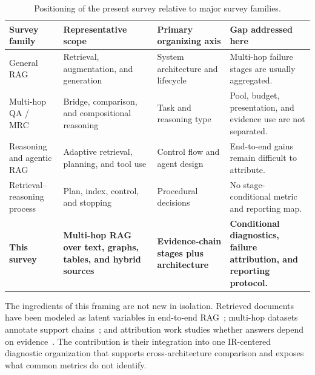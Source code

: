 \documentclass[manuscript,review]{acmart}
\theoremstyle{definition}
\theoremstyle{plain}
\theoremstyle{remark}
\begin{document}
\begin{table}[t]
\caption{Positioning of the present survey relative to major survey families.}
\label{tab:survey_crosswalk}
\centering
\scriptsize
\begin{tabularx}{\linewidth}{@{}p{2.5cm}p{2.7cm}p{2.8cm}Y@{}}
\toprule
Survey family & Representative scope & Primary organizing axis & Gap addressed here \\
\midrule
General RAG~\cite{gao2023ragsurvey,fan2024ragllmsurvey} & Retrieval, augmentation, and generation & System architecture and lifecycle & Multi-hop failure stages are usually aggregated. \\
Multi-hop QA / MRC~\cite{mavi2022mhqasurvey,mohammadi2024mhmrcsurvey} & Bridge, comparison, and compositional reasoning & Task and reasoning type & Pool, budget, presentation, and evidence use are not separated. \\
Reasoning and agentic RAG~\cite{singh2025agenticragsurvey,liang2025reasoningragsurvey} & Adaptive retrieval, planning, and tool use & Control flow and agent design & End-to-end gains remain difficult to attribute. \\
Retrieval--reasoning process~\cite{ji2026retrievalreasoning} & Plan, index, control, and stopping & Procedural decisions & No stage-conditional metric and reporting map. \\
\textbf{This survey} & \textbf{Multi-hop RAG over text, graphs, tables, and hybrid sources} & \textbf{Evidence-chain stages plus architecture} & \textbf{Conditional diagnostics, failure attribution, and reporting protocol.} \\
\bottomrule
\end{tabularx}
\end{table}

The ingredients of this framing are not new in isolation. Retrieved documents
have been modeled as latent variables in end-to-end RAG~\cite{lewis2020rag,guu2020realm};
multi-hop datasets annotate support chains~\cite{yang2018hotpotqa,ho2020wikimultihopqa,trivedi2022musique};
and attribution work studies whether answers depend on evidence~\cite{gao2023alce,liu2023evaluating,wu2024cofca,xu2025veritas}.
The contribution is their integration into one IR-centered diagnostic
organization that supports cross-architecture comparison and exposes what
common metrics do not identify.
\end{document}
